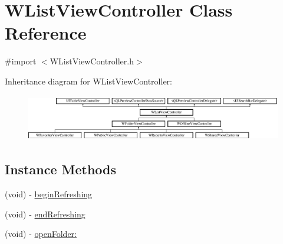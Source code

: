 \hypertarget{interface_w_list_view_controller}{\section{W\-List\-View\-Controller Class Reference}
\label{interface_w_list_view_controller}
}


{\ttfamily \#import $<$W\-List\-View\-Controller.\-h$>$}

Inheritance diagram for W\-List\-View\-Controller\-:\begin{figure}[H]
\begin{center}
\leavevmode
\includegraphics[height=2.036364cm]{interface_w_list_view_controller}
\end{center}
\end{figure}
\subsection*{Instance Methods}
\begin{DoxyCompactItemize}
\item 
(void) -\/ \hyperlink{interface_w_list_view_controller_aa723f97d0ccff1329689ca0f59bccbd8}{begin\-Refreshing}
\item 
(void) -\/ \hyperlink{interface_w_list_view_controller_a98211e2bf598ec5a3b328dccea83be9b}{end\-Refreshing}
\item 
(void) -\/ \hyperlink{interface_w_list_view_controller_afba603bb459618acd263e5aa987659d8}{open\-Folder\-:}
\end{DoxyCompactItemize}
